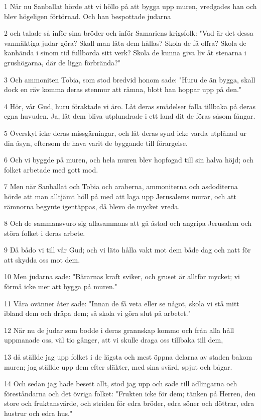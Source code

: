 \par 1 När nu Sanballat hörde att vi höllo på att bygga upp muren, vredgades han och blev högeligen förtörnad. Och han bespottade judarna
\par 2 och talade så inför sina bröder och inför Samariens krigsfolk: "Vad är det dessa vanmäktiga judar göra? Skall man låta dem hållas? Skola de få offra? Skola de kanhända i sinom tid fullborda sitt verk? Skola de kunna giva liv åt stenarna i grushögarna, där de ligga förbrända?"
\par 3 Och ammoniten Tobia, som stod bredvid honom sade: "Huru de än bygga, skall dock en räv komma deras stenmur att rämna, blott han hoppar upp på den."
\par 4 Hör, vår Gud, huru föraktade vi äro. Låt deras smädelser falla tillbaka på deras egna huvuden. Ja, låt dem bliva utplundrade i ett land dit de föras såsom fångar.
\par 5 Överskyl icke deras missgärningar, och låt deras synd icke varda utplånad ur din åsyn, eftersom de hava varit de byggande till förargelse.
\par 6 Och vi byggde på muren, och hela muren blev hopfogad till sin halva höjd; och folket arbetade med gott mod.
\par 7 Men när Sanballat och Tobia och araberna, ammoniterna och asdoditerna hörde att man alltjämt höll på med att laga upp Jerusalems murar, och att rämnorna begynte igentäppas, då blevo de mycket vreda.
\par 8 Och de sammansvuro sig allasammans att gå åstad och angripa Jerusalem och störa folket i deras arbete.
\par 9 Då bådo vi till vår Gud; och vi läto hålla vakt mot dem både dag och natt för att skydda oss mot dem.
\par 10 Men judarna sade: "Bärarnas kraft sviker, och gruset är alltför mycket; vi förmå icke mer att bygga på muren."
\par 11 Våra ovänner åter sade: "Innan de få veta eller se något, skola vi stå mitt ibland dem och dräpa dem; så skola vi göra slut på arbetet."
\par 12 När nu de judar som bodde i deras grannskap kommo och från alla håll uppmanade oss, väl tio gånger, att vi skulle draga oss tillbaka till dem,
\par 13 då ställde jag upp folket i de lägsta och mest öppna delarna av staden bakom muren; jag ställde upp dem efter släkter, med sina svärd, spjut och bågar.
\par 14 Och sedan jag hade besett allt, stod jag upp och sade till ädlingarna och föreståndarna och det övriga folket: "Frukten icke för dem; tänken på Herren, den store och fruktansvärde, och striden för edra bröder, edra söner och döttrar, edra hustrur och edra hus."
